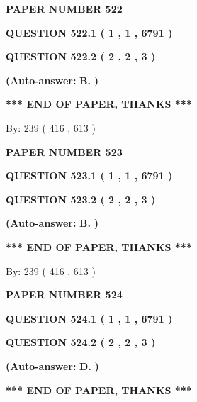\documentclass[12pt]{article}
\begin{document}
   
 {\textbf{ \Large{ PAPER NUMBER  522  }}}
   
   
   
   
  
  
{\textbf{\large{QUESTION
522.1 
 ( 1 , 1 , 6791 )
}}}
  
  
{\textbf{\large{QUESTION
522.2 
 ( 2 , 2 , 3 )
}}}
 
 
{\textbf{(Auto-answer:}}
{\textbf{\large{
B.}}}
{\textbf{)}}
 
 
   
   
   
   
\vspace{1.0in} 
{\textbf{\large{ *** END OF PAPER, THANKS *** }}} 
   
   
\hspace{1.0in} By: 
 239 ( 416 ,  613 )
   
   
   
   
\newpage 
\setcounter{page}{ 
   523001 } 
   
   
 {\textbf{ \Large{ PAPER NUMBER  523  }}}
   
   
   
   
  
  
{\textbf{\large{QUESTION
523.1 
 ( 1 , 1 , 6791 )
}}}
  
  
{\textbf{\large{QUESTION
523.2 
 ( 2 , 2 , 3 )
}}}
 
 
{\textbf{(Auto-answer:}}
{\textbf{\large{
B.}}}
{\textbf{)}}
 
 
   
   
   
   
\vspace{1.0in} 
{\textbf{\large{ *** END OF PAPER, THANKS *** }}} 
   
   
\hspace{1.0in} By: 
 239 ( 416 ,  613 )
   
   
   
   
\newpage 
\setcounter{page}{ 
   524001 } 
   
   
 {\textbf{ \Large{ PAPER NUMBER  524  }}}
   
   
   
   
  
  
{\textbf{\large{QUESTION
524.1 
 ( 1 , 1 , 6791 )
}}}
  
  
{\textbf{\large{QUESTION
524.2 
 ( 2 , 2 , 3 )
}}}
 
 
{\textbf{(Auto-answer:}}
{\textbf{\large{
D.}}}
{\textbf{)}}
 
 
   
   
   
   
\vspace{1.0in} 
{\textbf{\large{ *** END OF PAPER, THANKS *** }}} 
   
\end{document}
